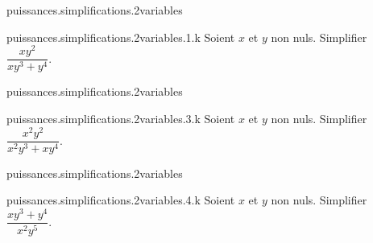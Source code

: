 \begin{qcm}{puissances.simplifications.2variables}
    \begin{question}{puissances.simplifications.2variables.1.k}
         Soient \(x\) et \(y\) non nuls. Simplifier \(\dfrac{xy^2}{xy^3+y^4}\).
         \begin{multicols}{3}
         \begin{reponses}
             \lastchoices
              
              \phantom{foo}
         \end{reponses}
        \end{multicols}
    \end{question}
\end{qcm}


\begin{qcm}{puissances.simplifications.2variables}
    \begin{question}{puissances.simplifications.2variables.3.k}
         Soient \(x\) et \(y\) non nuls. Simplifier \(\dfrac{x^2y^2}{x^2y^3+xy^4}\).
        \begin{multicols}{3}
         \begin{reponses}
             \lastchoices
              
                                          
              \phantom{foo}
         \end{reponses}
        \end{multicols}
    \end{question}
\end{qcm}

\begin{qcm}{puissances.simplifications.2variables}
    \begin{question}{puissances.simplifications.2variables.4.k}
         Soient \(x\) et \(y\) non nuls. Simplifier \(\dfrac{xy^3+y^4}{x^2y^5}\).
         \begin{multicols}{2}
         \begin{reponses}
             \lastchoices
              
              \phantom{foo}
         \end{reponses}
        \end{multicols}
    \end{question}
\end{qcm}

